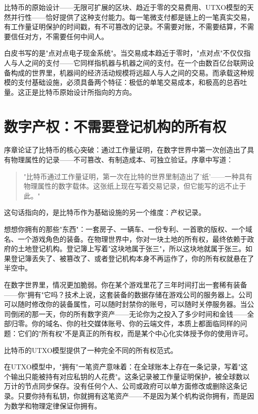 \documentclass[a4paper,12pt,openany]{ctexbook}
\begin{document}
比特币的原始设计——无限可扩展的区块、趋近于零的交易费用、UTXO模型的天然并行性——恰好提供了这种支付能力。每一笔微支付都是链上的一笔真实交易，有工作量证明保护的时间戳，有不可篡改的记录。不需要对账，不需要结算，不需要信任对方，不需要任何中间人。

白皮书写的是"点对点电子现金系统"。当交易成本趋近于零时，"点对点"不仅仅指人与人之间的支付——它同样指机器与机器之间的支付。在一个由数百亿台联网设备构成的世界里，机器间的经济活动规模将远超人与人之间的交易。而承载这种规模的支付基础设施，必须具备两个特征：极低的单笔交易成本，和极高的总吞吐量。这正是比特币原始设计所指向的方向。


\section*{数字产权：不需要登记机构的所有权}


序章论证了比特币的核心突破：通过工作量证明，在数字世界中第一次创造出了具有物理属性的记录——不可篡改、有制造成本、可独立验证。序章中写道：


\begin{quote}
"比特币通过工作量证明，第一次在比特的世界里制造出了'纸'——一种具有物理属性的数字载体。这张纸上现在写着交易记录，但它能写的远不止于此。"
\end{quote}


这句话指向的，是比特币作为基础设施的另一个维度：产权记录。

想想你拥有的那些"东西"：一套房子、一辆车、一份专利、一首歌的版权、一个域名、一个游戏角色的装备。在物理世界中，你对一块土地的所有权，最终依赖于政府的土地登记机构。登记簿上写着"这块地属于张三"，所以这块地就属于张三。如果登记簿丢失了、被篡改了、或者登记机构本身不再运作了，你的所有权就悬在了半空中。

在数字世界里，情况更加脆弱。你在某个游戏里花了三年时间打出一套稀有装备——你"拥有"它吗？技术上说，这套装备的数据存储在游戏公司的服务器上。公司可以随时修改你的装备属性，可以随时封禁你的账号，可以随时关停服务器。当公司倒闭的那一天，你的所有数字资产——无论你为之投入了多少时间和金钱——全部归零。你的域名、你的社交媒体账号、你的云端文件，本质上都面临同样的问题：它们的"所有权"不是真正的所有权，而是某个中心化实体授予你的使用许可。

比特币的UTXO模型提供了一种完全不同的所有权范式。

在UTXO模型中，"拥有"一笔资产意味着：在全球账本上存在一条记录，写着"这个输出只能被持有对应私钥的人花费"。这条记录被工作量证明保护，被全球数以万计的节点同步保存。没有任何个人、公司或政府可以单方面修改或删除这条记录。只要你持有私钥，你就拥有这笔资产——不是因为某个机构说你拥有，而是因为数学和物理定律保证你拥有。
\end{document}
